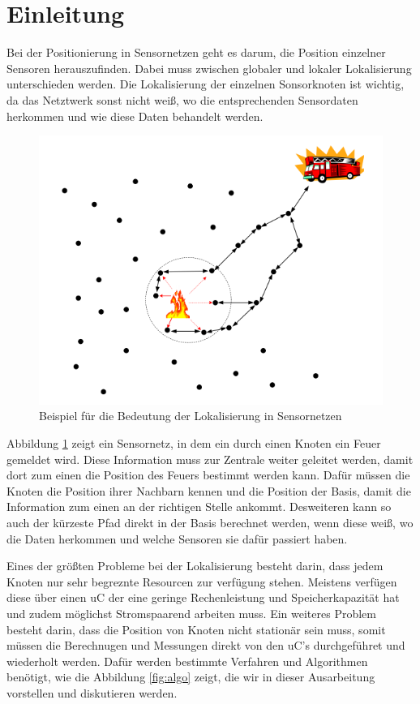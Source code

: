 \section{Einleitung}

Bei der Positionierung in Sensornetzen geht es darum, die Position
einzelner Sensoren herauszufinden. Dabei muss zwischen globaler und
lokaler Lokalisierung unterschieden werden. Die Lokalisierung der
einzelnen Sonsorknoten ist wichtig, da das Netztwerk sonst nicht weiß,
wo die entsprechenden Sensordaten herkommen und wie diese Daten
behandelt werden.

\begin{figure}[h!]
  \centering
  \includegraphics[scale=0.6]{img/lokalisierung_1}

  \caption{Beispiel für die Bedeutung der Lokalisierung in
    Sensornetzen}
  \label{fig:local}
\end{figure}

Abbildung \ref{fig:local} zeigt ein Sensornetz, in dem ein durch einen
Knoten ein Feuer gemeldet wird. Diese Information muss zur Zentrale
weiter geleitet werden, damit dort zum einen die Position des Feuers
bestimmt werden kann. Dafür müssen die Knoten die Position ihrer
Nachbarn kennen und die Position der Basis, damit die Information zum
einen an der richtigen Stelle ankommt. Desweiteren kann so auch der
kürzeste Pfad direkt in der Basis berechnet werden, wenn diese weiß,
wo die Daten herkommen und welche Sensoren sie dafür passiert haben.
\cite{gholami2011} 

Eines der größten Probleme bei der Lokalisierung besteht darin, dass
jedem Knoten nur sehr begreznte Resourcen zur verfügung stehen.
Meistens verfügen diese über einen \ac{uC} der eine geringe
Rechenleistung und Speicherkapazität hat und zudem möglichst
Stromspaarend arbeiten muss. \cite{timmermann} Ein weiteres Problem
besteht darin, dass die Position von Knoten nicht stationär sein muss,
somit müssen die Berechnugen und Messungen direkt von den \ac{uC}'s
durchgeführet und wiederholt werden. \cite{roehrig2009} Dafür werden
bestimmte Verfahren und Algorithmen benötigt, wie die Abbildung
\ref{fig:algo} zeigt, die wir in dieser Ausarbeitung vorstellen und
diskutieren werden.

